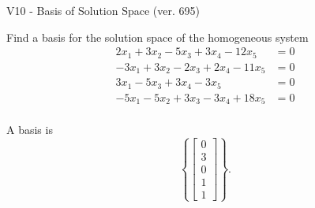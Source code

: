 \begin{exercise}
  \begin{exerciseTitle}V10 - Basis of Solution Space (ver. 695)\end{exerciseTitle}
  \begin{exerciseStatement}
    Find a basis for the solution space of the homogeneous system 
\begin{align*}
 2 x_ 1 + 3 x_ 2 -5 x_ 3 + 3 x_ 4 -12 x_ 5 &= 0  \\ 
  -3 x_ 1 + 3 x_ 2 -2 x_ 3 + 2 x_ 4 -11 x_ 5 &= 0  \\ 
  3 x_ 1 -5 x_ 3 + 3 x_ 4 -3 x_ 5 &= 0  \\ 
  -5 x_ 1 -5 x_ 2 + 3 x_ 3 -3 x_ 4 + 18 x_ 5 &= 0  \\ 
 \end{align*}


 
  \end{exerciseStatement}

  \begin{exerciseAnswer}
   A basis is   
\[\left\{\left[\begin{array}{c}
0 \\
3 \\
0 \\
1 \\
1
\end{array}\right]\right\}.\]

  


  \end{exerciseAnswer}
\end{exercise}